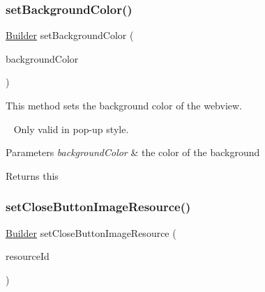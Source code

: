 \subsubsection{\texorpdfstring{set\+Background\+Color()}{setBackgroundColor()}}
{\footnotesize\ttfamily \hyperlink{classcom_1_1toast_1_1android_1_1gamebase_1_1_gamebase_web_view_configuration_1_1_builder}{Builder} set\+Background\+Color (\begin{DoxyParamCaption}\item[{int}]{background\+Color }\end{DoxyParamCaption})}



This method sets the background color of the webview. 

~\newline
 Only valid in pop-\/up style.


\begin{DoxyParams}{Parameters}
{\em background\+Color} & the color of the background \\
\hline
\end{DoxyParams}
\begin{DoxyReturn}{Returns}
this 
\end{DoxyReturn}
\mbox{\label{classcom_1_1toast_1_1android_1_1gamebase_1_1_gamebase_web_view_configuration_1_1_builder_a01ef1245b0fd70cc42aad5c681e668a5}} 
\subsubsection{\texorpdfstring{set\+Close\+Button\+Image\+Resource()}{setCloseButtonImageResource()}\hspace{0.1cm}{\footnotesize\ttfamily [1/2]}}
{\footnotesize\ttfamily \hyperlink{classcom_1_1toast_1_1android_1_1gamebase_1_1_gamebase_web_view_configuration_1_1_builder}{Builder} set\+Close\+Button\+Image\+Resource (\begin{DoxyParamCaption}\item[{@Drawable\+Res int}]{resource\+Id }\end{DoxyParamCaption})}



